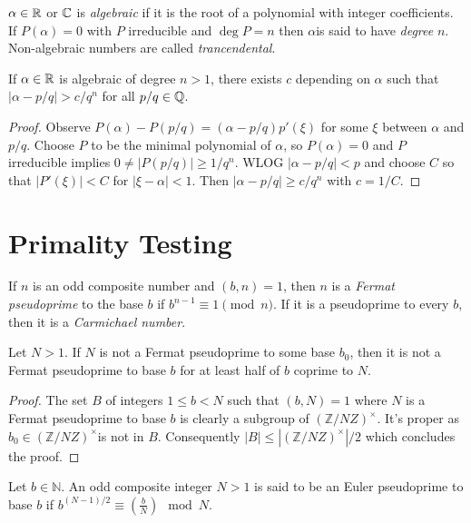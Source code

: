 \documentclass[a4paper, 10pt]{amsart}
\begin{document}
\begin{definition}
  $\alpha \in \mathbb{R}$ or $\mathbb{C}$ is \emph{algebraic} if it is the root of a polynomial with integer coefficients. If $P(\alpha) = 0$ with $P$ irreducible and $\deg P = n$ then $\alpha$is said to have \emph{degree} $n$. Non-algebraic numbers are called \emph{trancendental}.
\end{definition}

\begin{theorem}
If $\alpha \in \mathbb{R}$ is algebraic of degree $n > 1$, there exists $c$ depending on $\alpha$ such that $|\alpha - p/q| > c/q^n$ for all $p/q \in \mathbb{Q}$.
\end{theorem}
\begin{proof}
  Observe $P(\alpha) - P(p/q) = (\alpha - p/q)p'(\xi)$ for some $\xi$ between $\alpha$ and $p/q$. Choose $P$ to be the minimal polynomial of $\alpha$, so $P(\alpha) = 0$ and $P$ irreducible implies $0 \neq |P(p/q)| \geq 1/q^n$. WLOG $|\alpha - p/q| < p$ and choose $C$ so that $|P'(\xi)| < C$ for $|\xi - \alpha| < 1$. Then $|\alpha - p/q| \geq c/q^n$ with $c = 1/C$.
\end{proof}

\section{Primality Testing}

\begin{definition}
    If $n$ is an odd composite number and $(b, n) = 1$, then $n$ is a \emph{Fermat pseudoprime} to the base $b$ if $b^{n - 1} \equiv 1 \pmod{n}$. If it is a pseudoprime to every $b$, then it is a \emph{Carmichael number}.
\end{definition}

\begin{theorem}
  Let $N >1$. If $N$ is not a Fermat pseudoprime to some base $b_0$, then it is not a Fermat pseudoprime to base $b$ for at least half of $b$ coprime to $N$.
\end{theorem}
\begin{proof}
The set $B$ of integers $1 \leq b < N$ such that $(b, N) = 1$ where $N$ is a Fermat pseudoprime to base $b$ is clearly a subgroup of $(\mathbb{Z} / N Z)^{\times}$. It's proper as $b_0 \in(\mathbb{Z} / N Z)^{\times}$is not in $B$. Consequently $|B| \leq\left|(\mathbb{Z} / N Z)^{\times}\right| / 2$ which concludes the proof.
\end{proof}

\begin{definition}
Let $b \in \mathbb{N}$. An odd composite integer $N>1$ is said to be an Euler pseudoprime to base $b$ if $b^{(N-1) / 2} \equiv\left(\frac{b}{N}\right) \mod{N}$.
\end{definition}
\end{document}
